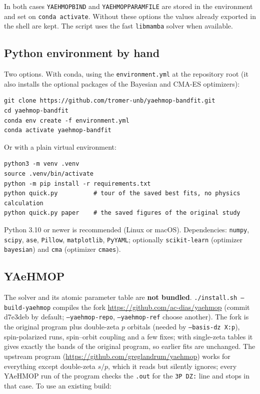 \documentclass[11pt,a4paper]{article}
\newcommand{\cmd}[1]{\texttt{#1}}
\renewcommand{\_}{\origunderscore\allowbreak}
\begin{document}
In both cases \cmd{YAEHMOP\_BIND} and \cmd{YAEHMOP\_PARAM\_FILE} are stored in the environment and set
on \cmd{conda activate}. Without these options the values already exported in the shell are kept. The
script uses the fast \cmd{libmamba} solver when available.

\subsection{Python environment by hand}

Two options. With conda, using the \cmd{environment.yml} at the repository root (it also installs the
optional packages of the Bayesian and CMA-ES optimizers):

\begin{lstlisting}[style=sh]
git clone https://github.com/tromer-unb/yaehmop-bandfit.git
cd yaehmop-bandfit
conda env create -f environment.yml
conda activate yaehmop-bandfit
\end{lstlisting}

Or with a plain virtual environment:

\begin{lstlisting}[style=sh]
python3 -m venv .venv
source .venv/bin/activate
python -m pip install -r requirements.txt
python quick.py          # tour of the saved best fits, no physics calculation
python quick.py paper    # the saved figures of the original study
\end{lstlisting}

Python 3.10 or newer is recommended (Linux or macOS). Dependencies: \cmd{numpy}, \cmd{scipy}, \cmd{ase},
\cmd{Pillow}, \cmd{matplotlib}, \cmd{PyYAML}; optionally \cmd{scikit-learn} (optimizer \cmd{bayesian})
and \cmd{cma} (optimizer \cmd{cmaes}).

\subsection{YAeHMOP}

The solver and its atomic parameter table are \textbf{not bundled}. \cmd{./install.sh --build-yaehmop}
compiles the fork \url{https://github.com/ac-dias/yaehmop} (commit d7e3deb by default;
\cmd{--yaehmop-repo}, \cmd{--yaehmop-ref} choose another). The fork is the original program plus
double-zeta $p$ orbitals (needed by \cmd{--basis-dz X:p}), spin-polarized runs, spin--orbit coupling and a
few fixes; with single-zeta tables it gives exactly the bands of the original program, so earlier fits
are unchanged. The upstream program (\url{https://github.com/greglandrum/yaehmop}) works for everything
except double-zeta $s/p$, which it reads but silently ignores; every YAeHMOP run of the program checks
the \cmd{.out} for the \cmd{3P DZ:} line and stops in that case. To use an existing build:
\end{document}
